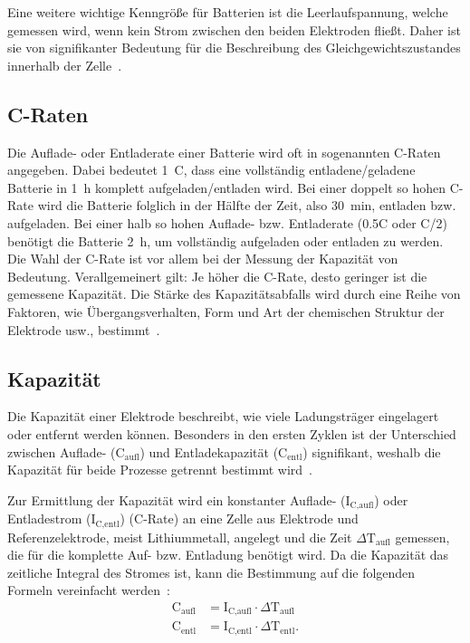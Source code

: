Eine weitere wichtige Kenngröße für Batterien ist die Leerlaufspannung, welche gemessen wird, wenn kein Strom zwischen den beiden Elektroden fließt. Daher ist sie von signifikanter Bedeutung für die Beschreibung des Gleichgewichtszustandes innerhalb der Zelle~\cite{Newman2021}.

\subsection{C-Raten}
Die Auflade- oder Entladerate einer Batterie wird oft in sogenannten C-Raten angegeben. Dabei bedeutet 1~C, dass eine vollständig entladene/geladene Batterie in 1~h komplett aufgeladen/entladen wird. Bei einer doppelt so hohen C-Rate wird die Batterie folglich in der Hälfte der Zeit, also 30~min, entladen bzw. aufgeladen. Bei einer halb so hohen Auflade- bzw. Entladerate (0.5C oder C/2) benötigt die Batterie 2~h, um vollständig aufgeladen oder entladen zu werden. Die Wahl der C-Rate ist vor allem bei der Messung der Kapazität von Bedeutung. Verallgemeinert gilt: Je höher die C-Rate, desto geringer ist die gemessene Kapazität. Die Stärke des Kapazitätsabfalls wird durch eine Reihe von Faktoren, wie Übergangsverhalten, Form und Art der chemischen Struktur der Elektrode usw., bestimmt~\cite{Plett2015,Beard2019}.


\subsection{Kapazität}
Die Kapazität einer Elektrode beschreibt, wie viele Ladungsträger eingelagert oder entfernt werden können. Besonders in den ersten Zyklen ist der Unterschied zwischen Auflade- ($\text{C}_{\text{aufl}}$) und Entladekapazität ($\text{C}_{\text{entl}}$) signifikant, weshalb die Kapazität für beide Prozesse getrennt bestimmt wird~\cite{Plett2015}.

Zur Ermittlung der Kapazität wird ein konstanter Auflade- ($\text{I}_\text{C,aufl}$) oder Entladestrom ($\text{I}_\text{C,entl}$) (C-Rate) an eine Zelle aus Elektrode und Referenzelektrode, meist Lithiummetall, angelegt und die Zeit $\Delta \text{T}_\text{aufl}$ gemessen, die für die komplette Auf- bzw. Entladung benötigt wird. Da die Kapazität das zeitliche Integral des Stromes ist, kann die Bestimmung auf die folgenden Formeln vereinfacht werden~\cite{Newman2021}:
\begin{align}
	\text{C}_{\text{aufl}} &= \text{I}_\text{C,aufl} \cdot \Delta \text{T}_\text{aufl}\\
	\text{C}_{\text{entl}} &= \text{I}_\text{C,entl} \cdot \Delta \text{T}_\text{entl}.
\end{align}

